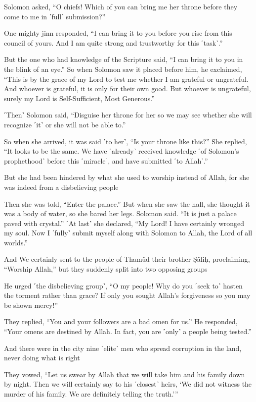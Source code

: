 Solomon asked, “O chiefs! Which of you can bring me her throne before they come to me in ˹full˺ submission?”

One mighty jinn responded, “I can bring it to you before you rise from this council of yours. And I am quite strong and trustworthy for this ˹task˺.”

But the one who had knowledge of the Scripture said, “I can bring it to you in the blink of an eye.” So when Solomon saw it placed before him, he exclaimed, “This is by the grace of my Lord to test me whether I am grateful or ungrateful. And whoever is grateful, it is only for their own good. But whoever is ungrateful, surely my Lord is Self-Sufficient, Most Generous.”

˹Then˺ Solomon said, “Disguise her throne for her so we may see whether she will recognize ˹it˺ or she will not be able to.”

So when she arrived, it was said ˹to her˺, “Is your throne like this?” She replied, “It looks to be the same. We have ˹already˺ received knowledge ˹of Solomon’s prophethood˺ before this ˹miracle˺, and have submitted ˹to Allah˺.”

But she had been hindered by what she used to worship instead of Allah, for she was indeed from a disbelieving people

Then she was told, “Enter the palace.” But when she saw the hall, she thought it was a body of water, so she bared her legs. Solomon said. “It is just a palace paved with crystal.” ˹At last˺ she declared, “My Lord! I have certainly wronged my soul. Now I ˹fully˺ submit myself along with Solomon to Allah, the Lord of all worlds.”

And We certainly sent to the people of Thamûd their brother Ṣâliḥ, proclaiming, “Worship Allah,” but they suddenly split into two opposing groups

He urged ˹the disbelieving group˺, “O my people! Why do you ˹seek to˺ hasten the torment rather than grace? If only you sought Allah’s forgiveness so you may be shown mercy!”

They replied, “You and your followers are a bad omen for us.” He responded, “Your omens are destined by Allah. In fact, you are ˹only˺ a people being tested.”

And there were in the city nine ˹elite˺ men who spread corruption in the land, never doing what is right

They vowed, “Let us swear by Allah that we will take him and his family down by night. Then we will certainly say to his ˹closest˺ heirs, ‘We did not witness the murder of his family. We are definitely telling the truth.’”

